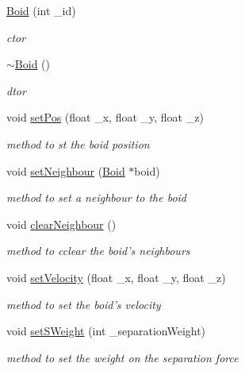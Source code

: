 \begin{DoxyCompactItemize}
\item 
\hyperlink{classBoid_a5d1abb62ea2b9f7adc764d648614bf51}{Boid} (int \_\-id)
\begin{DoxyCompactList}\small\item\em ctor \item\end{DoxyCompactList}\item 
\hyperlink{classBoid_a712f84ddc1b8ad06ad7ecd6c10a1666c}{$\sim$Boid} ()
\begin{DoxyCompactList}\small\item\em dtor \item\end{DoxyCompactList}\item 
void \hyperlink{classBoid_a38026ec733e0e7e705127e3f88f69b99}{setPos} (float \_\-x, float \_\-y, float \_\-z)
\begin{DoxyCompactList}\small\item\em method to st the boid position \item\end{DoxyCompactList}\item 
void \hyperlink{classBoid_a97552481a8c6f43e203d0bc2df083830}{setNeighbour} (\hyperlink{classBoid}{Boid} $\ast$boid)
\begin{DoxyCompactList}\small\item\em method to set a neighbour to the boid \item\end{DoxyCompactList}\item 
void \hyperlink{classBoid_aeb1fd57777cec9eab3f735312c2a2599}{clearNeighbour} ()
\begin{DoxyCompactList}\small\item\em method to cclear the boid's neighbours \item\end{DoxyCompactList}\item 
void \hyperlink{classBoid_a610fd5764690285c3c81135c30162633}{setVelocity} (float \_\-x, float \_\-y, float \_\-z)
\begin{DoxyCompactList}\small\item\em method to set the boid's velocity \item\end{DoxyCompactList}\item 
void \hyperlink{classBoid_af24205fb4e30e0e746c3146c59252fda}{setSWeight} (int \_\-separationWeight)
\begin{DoxyCompactList}\small\item\em method to set the weight on the separation force \item\end{DoxyCompactList}\item 

\end{DoxyCompactItemize}
